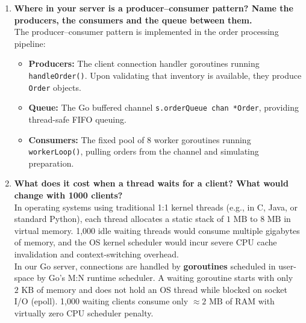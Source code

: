 \documentclass{labreport}
\begin{document}
\begin{enumerate}
    \item \textbf{Where in your server is a producer--consumer pattern? Name the producers, the consumers and the queue between them.}\\
    The producer--consumer pattern is implemented in the order processing pipeline:
    \begin{itemize}
        \item \textbf{Producers:} The client connection handler goroutines running \texttt{handleOrder()}. Upon validating that inventory is available, they produce \texttt{Order} objects.
        \item \textbf{Queue:} The Go buffered channel \texttt{s.orderQueue chan *Order}, providing thread-safe FIFO queuing.
        \item \textbf{Consumers:} The fixed pool of 8 worker goroutines running \texttt{workerLoop()}, pulling orders from the channel and simulating preparation.
    \end{itemize}

    \item \textbf{What does it cost when a thread waits for a client? What would change with 1000 clients?}\\
    In operating systems using traditional 1:1 kernel threads (e.g., in C, Java, or standard Python), each thread allocates a static stack of $1\text{ MB}$ to $8\text{ MB}$ in virtual memory. 1,000 idle waiting threads would consume multiple gigabytes of memory, and the OS kernel scheduler would incur severe CPU cache invalidation and context-switching overhead.\\
    In our Go server, connections are handled by \textbf{goroutines} scheduled in user-space by Go's M:N runtime scheduler. A waiting goroutine starts with only $2\text{ KB}$ of memory and does not hold an OS thread while blocked on socket I/O (epoll). 1,000 waiting clients consume only $\approx 2\text{ MB}$ of RAM with virtually zero CPU scheduler penalty.


\end{enumerate}
\end{document}
